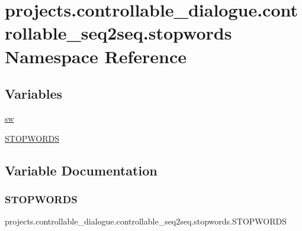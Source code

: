 \hypertarget{namespaceprojects_1_1controllable__dialogue_1_1controllable__seq2seq_1_1stopwords}{}\section{projects.\+controllable\+\_\+dialogue.\+controllable\+\_\+seq2seq.\+stopwords Namespace Reference}
\label{namespaceprojects_1_1controllable__dialogue_1_1controllable__seq2seq_1_1stopwords}
\subsection*{Variables}
\begin{DoxyCompactItemize}
\item 
\hyperlink{namespaceprojects_1_1controllable__dialogue_1_1controllable__seq2seq_1_1stopwords_ae4f34f4c05a06b5dad83bc993a7316d0}{sw}
\item 
\hyperlink{namespaceprojects_1_1controllable__dialogue_1_1controllable__seq2seq_1_1stopwords_ae230de6bc072686759cf5894667998b1}{S\+T\+O\+P\+W\+O\+R\+DS}
\end{DoxyCompactItemize}


\subsection{Variable Documentation}
\mbox{\label{namespaceprojects_1_1controllable__dialogue_1_1controllable__seq2seq_1_1stopwords_ae230de6bc072686759cf5894667998b1}} 
\subsubsection{\texorpdfstring{S\+T\+O\+P\+W\+O\+R\+DS}{STOPWORDS}}
{\footnotesize\ttfamily projects.\+controllable\+\_\+dialogue.\+controllable\+\_\+seq2seq.\+stopwords.\+S\+T\+O\+P\+W\+O\+R\+DS}



